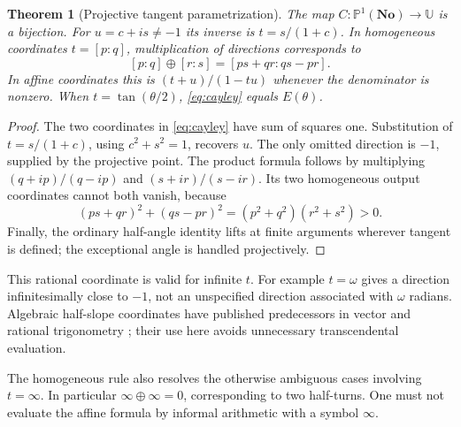 \documentclass[11pt,letterpaper]{article}
\newtheorem{theorem}{Theorem}[section]
\theoremstyle{definition}
\theoremstyle{remark}
\newcommand{\No}{\mathbf{No}}
\newcommand{\U}{\mathbb U}\newcommand{\PP}{\mathbb P}
\numberwithin{equation}{section}
\begin{document}
\begin{theorem}[Projective tangent parametrization]\label{thm:cayley}
The map $C:\PP^1(\No)\to\U$ is a bijection. For $u=c+is\ne-1$ its inverse is $t=s/(1+c)$. In homogeneous coordinates $t=[p:q]$, multiplication of directions corresponds to
\begin{equation}\label{eq:projectiveaddition}
 [p:q]\oplus[r:s]=[ps+qr:qs-pr].
\end{equation}
In affine coordinates this is $(t+u)/(1-tu)$ whenever the denominator is nonzero. When $t=\tan(\theta/2)$, \eqref{eq:cayley} equals $E(\theta)$.
\end{theorem}
\begin{proof}
The two coordinates in \eqref{eq:cayley} have sum of squares one. Substitution of $t=s/(1+c)$, using $c^2+s^2=1$, recovers $u$. The only omitted direction is $-1$, supplied by the projective point. The product formula follows by multiplying $(q+ip)/(q-ip)$ and $(s+ir)/(s-ir)$. Its two homogeneous output coordinates cannot both vanish, because
\[
 (ps+qr)^2+(qs-pr)^2=(p^2+q^2)(r^2+s^2)>0.
\]
Finally, the ordinary half-angle identity lifts at finite arguments wherever tangent is defined; the exceptional angle is handled projectively.
\end{proof}
This rational coordinate is valid for infinite $t$. For example $t=\omega$ gives a direction infinitesimally close to $-1$, not an unspecified direction associated with $\omega$ radians. Algebraic half-slope coordinates have published predecessors in vector and rational trigonometry \cite{Wildberger}; their use here avoids unnecessary transcendental evaluation.

The homogeneous rule also resolves the otherwise ambiguous cases involving $t=\infty$. In particular $\infty\oplus\infty=0$, corresponding to two half-turns. One must not evaluate the affine formula by informal arithmetic with a symbol $\infty$.
\end{document}

